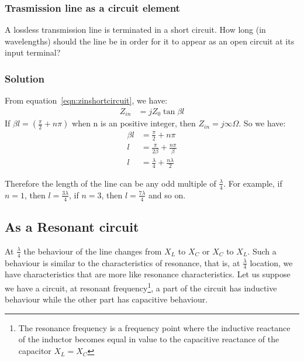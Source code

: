 \begin{exmp}
\subsubsection*{Trasmission line as a circuit element}
A lossless transmission line is terminated in a short circuit. How long (in wavelengths) should the line be in order for it to appear as an open circuit at its input terminal?

\subsubsection*{Solution}
From equation~\eqref{eqn:zinshortcircuit}, we have:
\begin{align*}
Z_{in} &= jZ_{0}\tan\beta l
\end{align*}
If $\beta l = (\frac{\pi}{2} + n\pi)$ when n is an positive integer, then $Z_{in} = j\infty\varOmega$. So we have:
\begin{align*}
\beta l &= \frac{\pi}{2} + n\pi\\
l &= \frac{\pi}{2\beta} + \frac{n\pi}{\beta}\\
l &= \frac{\lambda}{4} + \frac{n\lambda}{2}
\end{align*}

Therefore the length of the line can be any odd multiple of $\frac{\lambda}{4}$. For example, if $n = 1$, then $l = \frac{3\lambda}{4}$, if $n = 3$, then $l = \frac{7\lambda}{4}$ and so on.
\end{exmp}

\subsection{As a Resonant circuit}
At $ \frac{\lambda}{4} $ the behaviour of the line changes from $ X_{L} $ to $ X_{C} $ or $ X_{C} $ to $ X_{L} $. Such a behaviour is similar to the characteristics of resonance, that is, at $\frac{\lambda}{4}$ location, we have characteristics that are more like resonance characteristics. Let us suppose we have a circuit, at resonant frequency\footnote{
The resonance frequency is a frequency point where the inductive reactance of the inductor becomes equal in value to the capacitive reactance of the capacitor $ X_{L} = X_{C} $
}, a part of the circuit has inductive behaviour while the other part has capacitive behaviour. 

